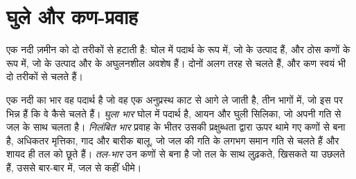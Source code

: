 \section{घुले और कण-प्रवाह}\label{sec:b1:erosion-transport:fluxes}

एक नदी ज़मीन को दो तरीकों से हटाती है: घोल में पदार्थ के रूप में, जो  के उत्पाद हैं, और ठोस कणों के रूप में, जो  के उत्पाद और  के अघुलनशील अवशेष हैं। दोनों अलग तरह से चलते हैं, और कण स्वयं भी दो तरीकों से चलते हैं।

\begin{definition}[घुला भार, निलंबित भार, तल-भार]\label{def:b1:erosion-transport:load}
एक नदी का भार वह पदार्थ है जो वह एक अनुप्रस्थ काट से आगे ले जाती है, तीन भागों में, जो इस पर भिन्न हैं कि वे कैसे चलते हैं। \emph{घुला भार} घोल में पदार्थ है, आयन और घुली सिलिका, जो अपनी गति से जल के साथ चलता है। \emph{निलंबित भार} प्रवाह के भीतर उसकी प्रक्षुब्धता द्वारा ऊपर थामे गए कणों से बना है, अधिकतर मृत्तिका, गाद और बारीक बालू, जो जल की गति के लगभग समान गति से चलते हैं और शायद ही तल को छूते हैं। \emph{तल-भार} उन कणों से बना है जो तल के साथ लुढ़कते, खिसकते या उछलते हैं, उससे बार-बार  में, जल से कहीं धीमे।
\end{definition}

